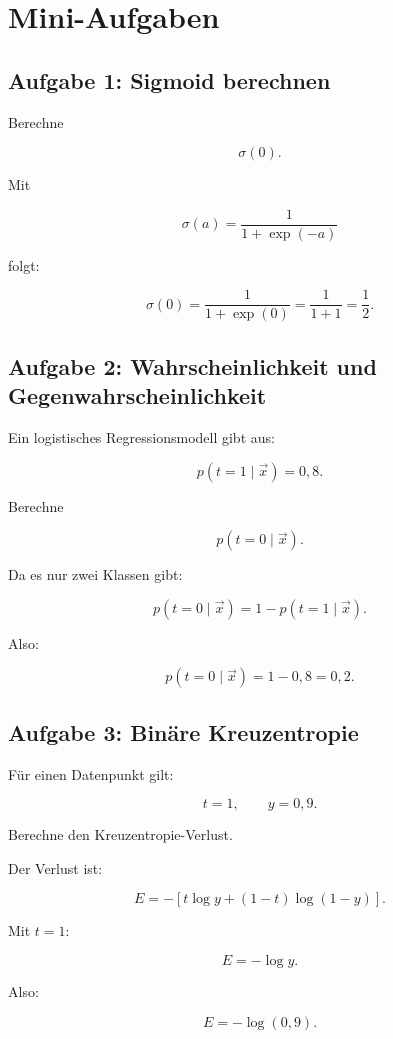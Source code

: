 \section{Mini-Aufgaben}

\subsection{Aufgabe 1: Sigmoid berechnen}

Berechne

\[
    \sigma(0).
\]

\begin{examplebox}
Mit

\[
    \sigma(a)
    =
    \frac{1}{1+\exp(-a)}
\]

folgt:

\[
    \sigma(0)
    =
    \frac{1}{1+\exp(0)}
    =
    \frac{1}{1+1}
    =
    \frac{1}{2}.
\]
\end{examplebox}

\subsection{Aufgabe 2: Wahrscheinlichkeit und Gegenwahrscheinlichkeit}

Ein logistisches Regressionsmodell gibt aus:

\[
    p(t=1\mid\vec{x})=0{,}8.
\]

Berechne

\[
    p(t=0\mid\vec{x}).
\]

\begin{examplebox}
Da es nur zwei Klassen gibt:

\[
    p(t=0\mid\vec{x})
    =
    1-p(t=1\mid\vec{x}).
\]

Also:

\[
    p(t=0\mid\vec{x})
    =
    1-0{,}8
    =
    0{,}2.
\]
\end{examplebox}

\subsection{Aufgabe 3: Binäre Kreuzentropie}

Für einen Datenpunkt gilt:

\[
    t=1,
    \qquad
    y=0{,}9.
\]

Berechne den Kreuzentropie-Verlust.

\begin{examplebox}
Der Verlust ist:

\[
    E
    =
    -\left[
        t\log y
        +
        (1-t)\log(1-y)
    \right].
\]

Mit \(t=1\):

\[
    E
    =
    -\log y.
\]

Also:

\[
    E
    =
    -\log(0{,}9).
\]
\end{examplebox}

